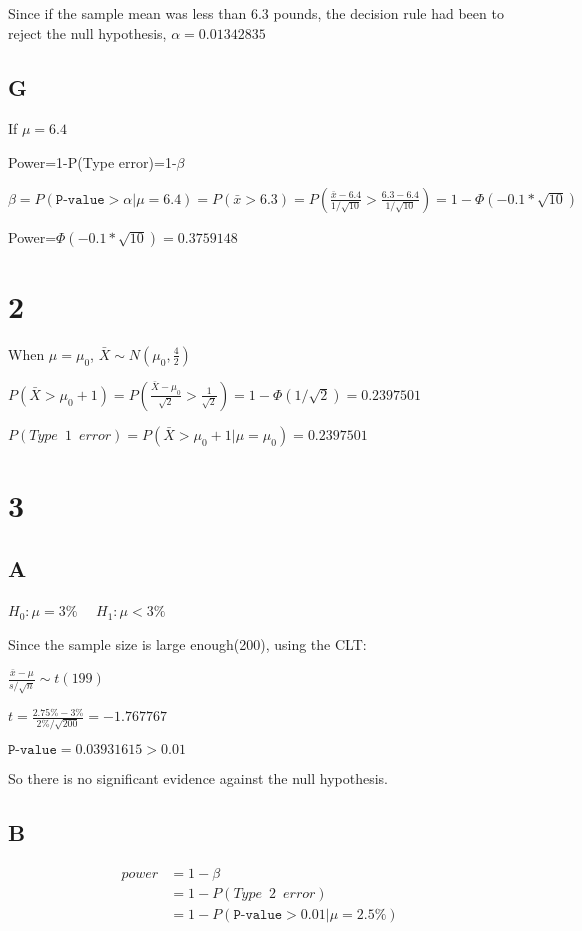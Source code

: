 \documentclass{article}
\begin{document}
Since if the sample mean was less than 6.3 pounds, the decision rule had been to reject the null hypothesis, $\alpha=0.01342835$

\subsection*{G}

If $\mu=6.4$

Power=1-P(Type \uppercase\expandafter{} error)=1-$\beta$

$\beta=P(\texttt{P-value}>\alpha|\mu=6.4)=P(\bar{x}>6.3)=P(\frac{\bar{x}-6.4}{1/\sqrt{10}}>\frac{6.3-6.4}{1/\sqrt{10}})=1-\Phi(-0.1*\sqrt{10})$

Power=$\Phi(-0.1*\sqrt{10})=0.3759148$

\newpage

\section*{2}
When $\mu=\mu_0$, $\bar{X}\sim N(\mu_0,\frac{4}{2})$

$P(\bar{X}>\mu_0+1)=P(\frac{\bar{X}-\mu_0}{\sqrt{2}}>\frac{1}{\sqrt{2}})=1-\Phi(1/\sqrt{2})=0.2397501$

$P(Type\enspace 1\enspace error)=P(\bar{X}>\mu_0+1|\mu=\mu_0)=0.2397501$


\section*{3}
\subsection*{A}
$H_0:\mu=3\%$ $\quad H_1: \mu<3\%$

Since the sample size is large enough(200), using the CLT:

$\frac{\bar{x}-\mu}{s/\sqrt{n}}\sim t(199)$

$t=\frac{2.75\%-3\%}{2\%/\sqrt{200}}=-1.767767$

$\texttt{P-value}=0.03931615>0.01$

So there is no significant evidence against the null hypothesis.

\subsection*{B}
\begin{equation*}
	\begin{split}
		power&=1-\beta\\
		&=1-P(Type\enspace 2\enspace error)\\
		&=1-P(\texttt{P-value}>0.01|\mu=2.5\%)
	\end{split}
\end{equation*}
\end{document}
